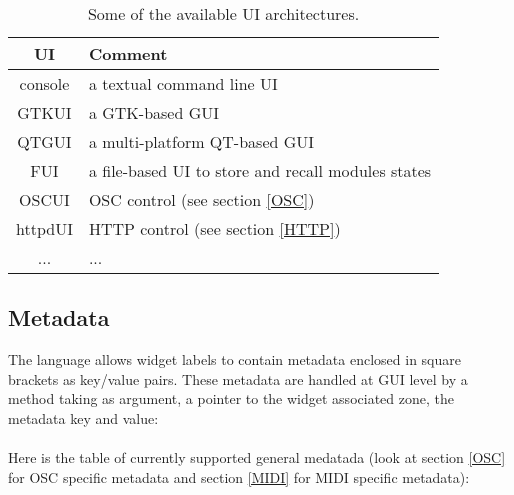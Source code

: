 \label{tab:uiarch}

\begin{table}[htp]
\begin{center}
\begin{tabular}{|c|l|}
\hline
\bf{UI} & \bf{Comment} \\
\hline
console & a textual command line UI \\
GTKUI & a GTK-based GUI \\
QTGUI & a multi-platform QT-based GUI \\
FUI & a file-based UI to store and recall modules states \\
OSCUI & OSC control (see section \ref{OSC}) \\
httpdUI & HTTP control (see section \ref{HTTP}) \\
...  & ... \\
\hline
\end{tabular}
\end{center}
\caption{Some of the available UI architectures.}
\end{table}%

\subsection{Metadata}
\label{sec:metadata}
The \faust language allows widget labels to contain metadata enclosed in square brackets as key/value pairs. These metadata are handled at GUI level by a  method taking as argument, a pointer to the widget associated zone, the metadata key and value: \\
\htab{} \\

Here is the table of currently supported general medatada (look at section \ref{OSC} for OSC specific metadata and section \ref{MIDI} for MIDI specific metadata):

